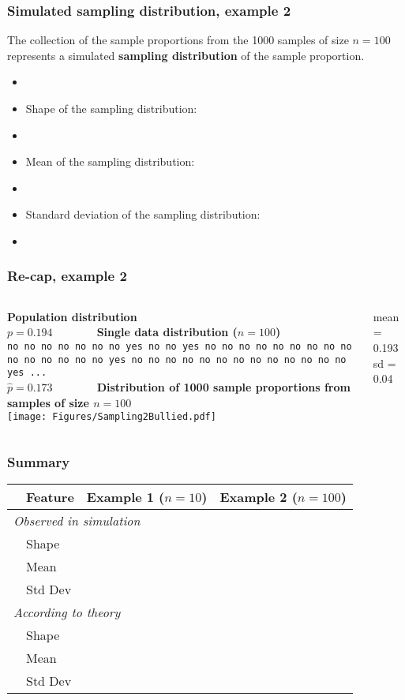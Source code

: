 \begin{frame}
\frametitle{Simulated sampling distribution, example 2}
The collection of the sample proportions from the 1000 samples of size $n=100$ represents a simulated \textbf{sampling distribution} of the sample proportion.
\begin{itemize}
    \item[]
    \item
    Shape of the sampling distribution:
    \item[]
    \item
    Mean of the sampling distribution:
    \item[]
    \item
    Standard deviation of the sampling distribution:
    \item[]
\end{itemize}
\end{frame}

\begin{frame}
\frametitle{Re-cap, example 2}
\begin{columns}
\textbf{Population distribution}\\
\vskip10pt
$p=0.194$
\vskip110pt
\textcolor{white}{nothing}
\textbf{Single data distribution ($n=100$)}\\
\vskip10pt
\texttt{no no no no no no no yes no  no yes  no  no  no  no  no  no  no  no  no  no  no  no  no  no  no  yes no  no  no  no  no  no  no  no  no  no  no  no  no yes  ...}\\
\vskip10pt
$\hat{p}=0.173$	
\textcolor{white}{nothing}
\textbf{Distribution of 1000 sample proportions from samples of size $n=100$}\\
\texttt{[image: Figures/Sampling2Bullied.pdf]}
\begin{center}
    mean = 0.193\\
     sd  = 0.04
\end{center}
\end{columns}
\end{frame}


\begin{frame}
\frametitle{Summary}
{\renewcommand{\arraystretch}{1.5}
\begin{tabular}{p{0.1cm} p{2cm} p{3.7cm} p{3.7cm}}
\toprule
& Feature & Example 1 ($n=10$) & Example 2 ($n=100$) \\
\midrule
\multicolumn{3}{l}{\emph{Observed in simulation}}  \\
& Shape  & & \\
& Mean   & & \\
& Std Dev & & \\
\midrule
\multicolumn{3}{l}{\emph{According to theory}}  \\
& Shape  & & \\
& Mean   & & \\
& Std Dev & & \\
\bottomrule
\end{tabular}}
\end{frame}

